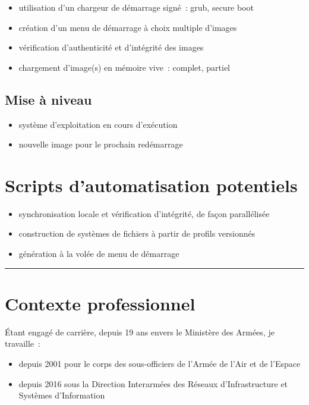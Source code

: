 \documentclass[10pt]{article}
\newcommand{\hr}{\rule{\textwidth}{1pt}}
\newenvironment{itmz}{\begin{itemize}
\setlength{\itemsep}{0em}
}{\end{itemize}}
\begin{document}
\begin{itmz}
\item{utilisation d’un chargeur de démarrage signé : grub, secure boot}
\item{création d’un menu de démarrage à choix multiple d’images}
\item{vérification d’authenticité et d’intégrité des images}
\item{chargement d’image(s) en mémoire vive : complet, partiel}
\end{itmz}

\subsection{Mise à niveau}

\begin{itmz}
\item{système d’exploitation en cours d’exécution}
\item{nouvelle image pour le prochain redémarrage}
\end{itmz}

\section{Scripts d’automatisation potentiels}

\begin{itmz}
\item{synchronisation locale et vérification d’intégrité, de façon parallélisée}
\item{construction de systèmes de fichiers à partir de profils versionnés}
\item{génération à la volée de menu de démarrage}
\end{itmz}

\hr

\appendix

\section{Contexte professionnel}

Étant engagé de carrière, depuis 19 ans envers le Ministère des Armées, je travaille :
\begin{itmz}
\item{depuis 2001 pour le corps des sous-officiers de l’Armée de l’Air et de l’Espace}
\item{depuis 2016 sous la Direction Interarmées des Réseaux d’Infrastructure et Systèmes d’Information}
\end{itmz}
\end{document}
